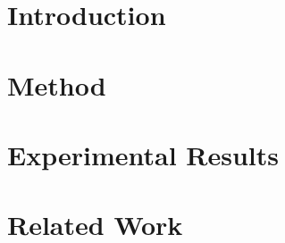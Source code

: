 \documentclass[acmlarge]{acmart}
\begin{document}
\section{Introduction} \label{sec:intro}




% 


% 

\section{Method} \label{sec:method}



\section{Experimental Results} \label{sec:results}



\vspace{3mm}
\section{Related Work} \label{sec:relatedWork}


\end{document}
